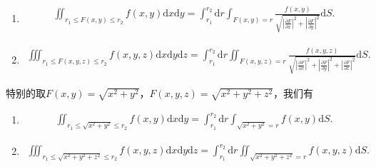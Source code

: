 \documentclass[../../main.tex]{subfiles}%
\begin{document}
\begin{theorem}[余面积公式]\label{theorem:余面积公式}
\begin{enumerate}[(1)]
\item
\begin{align*}
\iint_{r_1\leqslant F(x,y)\leqslant r_2} f(x,y)\mathrm{d}x\mathrm{d}y = \int_{r_1}^{r_2}\mathrm{d}r \int_{F(x,y)=r} \frac{f(x,y)}{\sqrt{\left|\frac{\partial F}{\partial x}\right|^2+\left|\frac{\partial F}{\partial y}\right|^2}}\mathrm{d}S.
\end{align*}
\item
\begin{align*}
\iiint_{r_1\leqslant F(x,y,z)\leqslant r_2} f(x,y,z)\mathrm{d}x\mathrm{d}y\mathrm{d}z = \int_{r_1}^{r_2}\mathrm{d}r \iint_{F(x,y,z)=r} \frac{f(x,y,z)}{\sqrt{\left|\frac{\partial F}{\partial x}\right|^2+\left|\frac{\partial F}{\partial y}\right|^2+\left|\frac{\partial F}{\partial z}\right|^2}}\mathrm{d}S.
\end{align*}
\end{enumerate}
\end{theorem}
\begin{remark}
特别的取$F(x,y)=\sqrt{x^2+y^2}$，$F(x,y,z)=\sqrt{x^2+y^2+z^2}$，我们有
\begin{enumerate}[(1)]
\item
\begin{align*}
\iint_{r_1\leqslant \sqrt{x^2+y^2}\leqslant r_2} f(x,y)\mathrm{d}x\mathrm{d}y = \int_{r_1}^{r_2}\mathrm{d}r \int_{\sqrt{x^2+y^2}=r} f(x,y)\mathrm{d}S.
\end{align*}
\item
\begin{align*}
\iiint_{r_1\leqslant \sqrt{x^2+y^2+z^2}\leqslant r_2} f(x,y,z)\mathrm{d}x\mathrm{d}y\mathrm{d}z = \int_{r_1}^{r_2}\mathrm{d}r \iint_{\sqrt{x^2+y^2+z^2}=r} f(x,y,z)\mathrm{d}S.
\end{align*}
\end{enumerate}
\end{remark}
\end{document}
